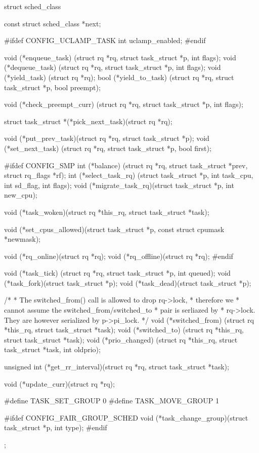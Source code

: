 \begin{cpp}
struct sched_class {
	const struct sched_class *next;

#ifdef CONFIG_UCLAMP_TASK
	int uclamp_enabled;
#endif

	void (*enqueue_task)
		(struct rq *rq, struct task_struct *p, int flags);
	void (*dequeue_task)
		(struct rq *rq, struct task_struct *p, int flags);
	void (*yield_task)   (struct rq *rq);
	bool (*yield_to_task)
		(struct rq *rq, struct task_struct *p, bool preempt);

	void (*check_preempt_curr)
		(struct rq *rq, struct task_struct *p, int flags);

	struct task_struct *(*pick_next_task)(struct rq *rq);

	void (*put_prev_task)(struct rq *rq, struct task_struct *p);
	void (*set_next_task)
		(struct rq *rq, struct task_struct *p, bool first);

#ifdef CONFIG_SMP
	int (*balance)
	  (struct rq *rq, struct task_struct *prev, struct rq_flags *rf);
	int  (*select_task_rq)
	  (struct task_struct *p, int task_cpu, int sd_flag, int flags);
	void (*migrate_task_rq)(struct task_struct *p, int new_cpu);

	void (*task_woken)(struct rq *this_rq, struct task_struct *task);

	void (*set_cpus_allowed)(struct task_struct *p,
				 const struct cpumask *newmask);

	void (*rq_online)(struct rq *rq);
	void (*rq_offline)(struct rq *rq);
#endif

	void (*task_tick)
		(struct rq *rq, struct task_struct *p, int queued);
	void (*task_fork)(struct task_struct *p);
	void (*task_dead)(struct task_struct *p);

	/*
	 * The switched_from() call is allowed to drop rq->lock, 
	 * therefore we
	 * cannot assume the switched_from/switched_to 
	 * pair is serliazed by
	 * rq->lock. They are however serialized by p->pi_lock.
	 */
	void (*switched_from)
		(struct rq *this_rq, struct task_struct *task);
	void (*switched_to) 
		(struct rq *this_rq, struct task_struct *task);
	void (*prio_changed)
		(struct rq *this_rq, struct task_struct *task,
			      int oldprio);

	unsigned int (*get_rr_interval)(struct rq *rq,
					struct task_struct *task);

	void (*update_curr)(struct rq *rq);

#define TASK_SET_GROUP		0
#define TASK_MOVE_GROUP		1

#ifdef CONFIG_FAIR_GROUP_SCHED
	void (*task_change_group)(struct task_struct *p, int type);
#endif
};

\end{cpp}
 
